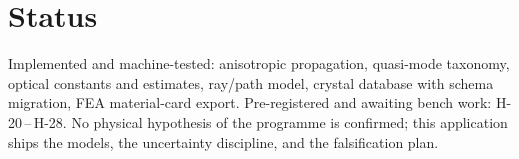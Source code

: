 \documentclass[10pt,letterpaper]{article}
\begin{document}
\section{Status}
Implemented and machine-tested: anisotropic propagation, quasi-mode
taxonomy, optical constants and estimates, ray/path model, crystal
database with schema migration, FEA material-card export. Pre-registered
and awaiting bench work: H-20\,--\,H-28. No physical hypothesis of the
programme is confirmed; this application ships the models, the
uncertainty discipline, and the falsification plan.



\end{document}
